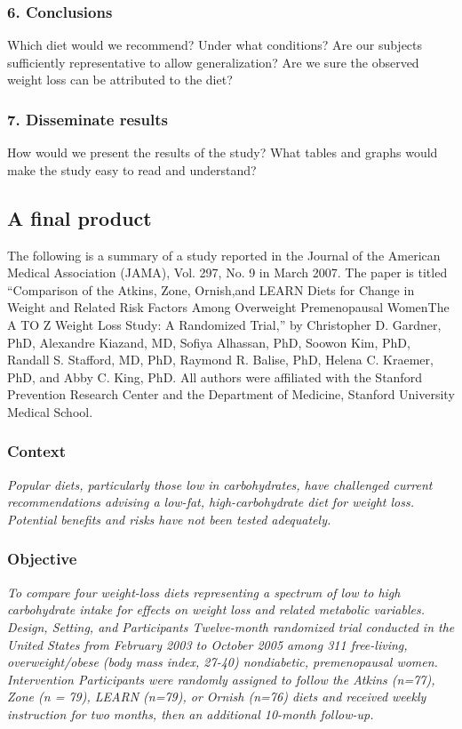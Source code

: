 \documentclass[11pt, chapterprefix=true]{scrbook}\usepackage[]{graphicx}\usepackage[]{color}
\begin{document}
\subsubsection{6.	Conclusions}

Which diet would we recommend?  Under what conditions? Are our subjects sufficiently representative to allow generalization?  Are we sure the observed weight loss can be attributed to the diet?

\subsubsection{7.	Disseminate results}

How would we present the results of the study?  What tables and graphs would make the study easy to read and understand?

\subsection{A final product}

The following is a summary of a study reported in the Journal of the American Medical Association (JAMA), Vol. 297, No. 9 in March 2007.  The paper is titled ``Comparison of the Atkins, Zone, Ornish,and LEARN Diets for Change in Weight and Related Risk Factors Among Overweight Premenopausal WomenThe A TO Z Weight Loss Study: A Randomized Trial,'' by Christopher D. Gardner, PhD, Alexandre Kiazand, MD, Sofiya Alhassan, PhD, Soowon Kim, PhD, Randall S. Stafford, MD, PhD, Raymond R. Balise, PhD, Helena C. Kraemer, PhD, and Abby C. King, PhD.  All authors were affiliated with the Stanford Prevention Research Center and the Department of Medicine, Stanford University Medical School.

\subsubsection{Context}

\textit{Popular diets, particularly those low in carbohydrates, have challenged current recommendations advising a low-fat, high-carbohydrate diet for weight loss. Potential benefits and risks have not been tested adequately.}

\subsubsection{Objective}

\textit{To compare four weight-loss diets representing a spectrum of low to high carbohydrate intake for effects on weight loss and related metabolic variables.  Design, Setting, and Participants Twelve-month randomized trial conducted in the United States from February 2003 to October 2005 among 311 free-living, overweight/obese (body mass index, 27-40) nondiabetic, premenopausal women.  Intervention Participants were randomly assigned to follow the Atkins (n=77), Zone (n = 79), LEARN (n=79), or Ornish (n=76) diets and received weekly instruction for two months, then an additional 10-month follow-up.}
\end{document}
